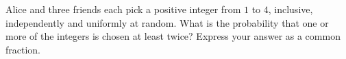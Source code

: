 Alice and three friends each pick a positive integer from $1$ to $4$, inclusive, independently and uniformly at random. What is the probability that one or more of the integers is chosen at least twice? Express your answer as a common fraction.
